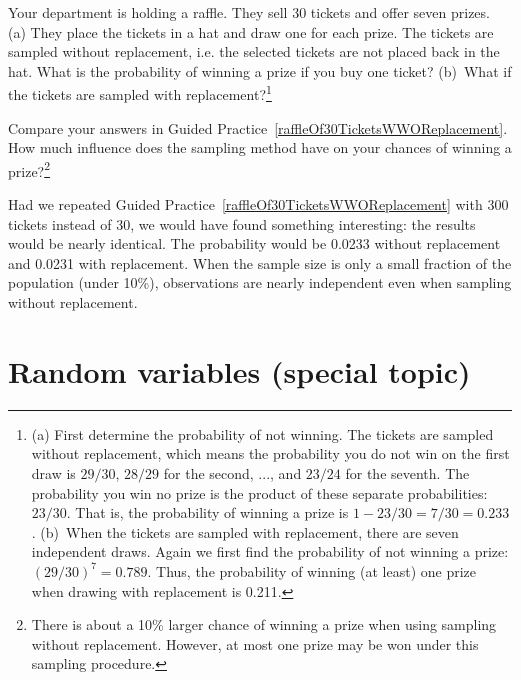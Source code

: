 \begin{exercise} \label{raffleOf30TicketsWWOReplacement}
Your department is holding a raffle. They sell 30 tickets and offer seven prizes. (a) They place the tickets in a hat and draw one for each prize. The tickets are sampled without replacement, i.e. the selected tickets are not placed back in the hat. What is the probability of winning a prize if you buy one ticket? (b)~What if the tickets are sampled with replacement?\footnote{(a) First determine the probability of not winning. The tickets are sampled without replacement, which means the probability you do not win on the first draw is $29/30$, $28/29$ for the second, ..., and $23/24$ for the seventh. The probability you win no prize is the product of these separate probabilities: $23/30$. That is, the probability of winning a prize is $1 - 23/30 = 7/30 = 0.233$. (b)~When the tickets are sampled with replacement, there are seven independent draws. Again we first find the probability of not winning a prize: $(29/30)^7 = 0.789$. Thus, the probability of winning (at least) one prize when drawing with replacement is 0.211.}
\end{exercise}

\begin{exercise} \label{followUpToRaffleOf30TicketsWWOReplacement}
Compare your answers in Guided Practice~\ref{raffleOf30TicketsWWOReplacement}. How much influence does the sampling method have on your chances of winning a prize?\footnote{There is about a 10\% larger chance of winning a prize when using sampling without replacement. However, at most one prize may be won under this sampling procedure.}
\end{exercise}

Had we repeated Guided Practice~\ref{raffleOf30TicketsWWOReplacement} with 300 tickets instead of 30, we would have found something interesting: the results would be nearly identical. The probability would be 0.0233 without replacement and 0.0231 with replacement. When the sample size is only a small fraction of the population (under 10\%), observations are nearly independent even when sampling without replacement.



\textC{\newpage}



\section{Random variables (special topic)}
\label{randomVariablesSection}

